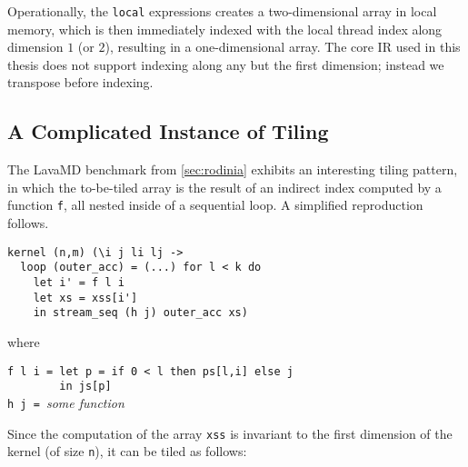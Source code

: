 Operationally, the \lstinline{local} expressions creates a
two-dimensional array in local memory, which is then immediately
indexed with the local thread index along dimension $1$ (or $2$),
resulting in a one-dimensional array.  The core IR used in this thesis
does not support indexing along any but the first dimension; instead
we transpose before indexing.

\subsection{A Complicated Instance of Tiling}
\label{sec:lavamd-tiling}

The LavaMD benchmark from \cref{sec:rodinia} exhibits an interesting
tiling pattern, in which the to-be-tiled array is the result of an
indirect index computed by a function \texttt{f}, all nested inside of
a sequential loop.  A simplified reproduction follows.

\begin{lstlisting}
kernel (n,m) (\i j li lj ->
  loop (outer_acc) = (...) for l < k do
    let i' = f l i
    let xs = xss[i']
    in stream_seq (h j) outer_acc xs)
\end{lstlisting}
\begin{minipage}[t]{0.1\linewidth}
  \begin{flushright}
    where
  \end{flushright}
\end{minipage}
\begin{minipage}[t]{0.8\linewidth}
\lstinline{f l i = let p = if 0 < l then ps[l,i] else j}\\
\lstinline{        in js[p]}\\
\lstinline{h j = }\textit{some function}
\end{minipage}
\vspace{1em}

Since the computation of the array \texttt{xss} is invariant to the
first dimension of the kernel (of size \texttt{n}), it can be tiled as
follows:


